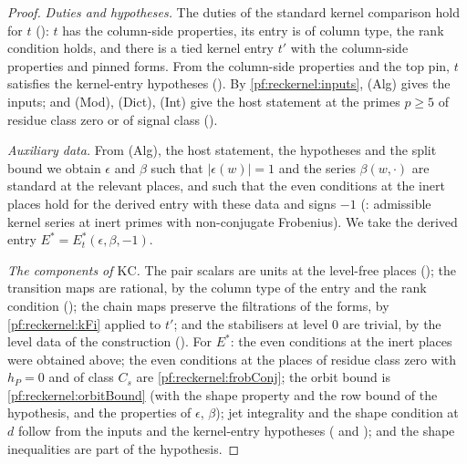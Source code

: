 \begin{proof}
\emph{Duties and hypotheses.} The duties of the standard kernel comparison hold for $t$
(): $t$ has the column-side properties, its
entry is of column type, the rank condition holds, and there is a tied kernel entry $t'$ with the column-side properties
and pinned forms. From the column-side properties and the top pin, $t$ satisfies the kernel-entry hypotheses
(). By \cref{pf:reckernel:inputs}, \textup{(Alg)} gives
the inputs; and \textup{(Mod)}, \textup{(Dict)}, \textup{(Int)} give the host statement at the primes $p\ge5$ of residue
class zero or of signal class ().

\emph{Auxiliary data.} From \textup{(Alg)}, the host statement, the hypotheses and the split bound we obtain $\epsilon$ and
$\beta$ such that $|\epsilon(w)|=1$ and the series $\beta(w,\cdot)$ are standard at the relevant places, and such that the
even conditions at the inert places hold for the derived entry with these data and signs $-1$
(: admissible kernel series at inert
primes with non-conjugate Frobenius). We take the derived entry $E^\ast=E_t^\ast(\epsilon,\beta,-1)$.

\emph{The components of $\mathrm{KC}$.} The pair scalars are units at the level-free places
(); the transition maps are rational, by the column type
of the entry and the rank condition (); the chain maps preserve the
filtrations of the forms, by \cref{pf:reckernel:kFi} applied to $t'$; and the stabilisers at level $0$ are trivial, by
the level data of the construction (). For $E^\ast$: the even conditions
at the inert places were obtained above; the even conditions at the places of residue class zero with $h_P=0$ and of class
$C_s$ are \cref{pf:reckernel:frobConj}; the orbit bound is \cref{pf:reckernel:orbitBound} (with the shape property and the
row bound of the hypothesis, and the properties of $\epsilon$, $\beta$); jet integrality and the shape condition at $d$
follow from the inputs and the kernel-entry hypotheses
( and );
and the shape inequalities are part of the hypothesis.
\end{proof}

